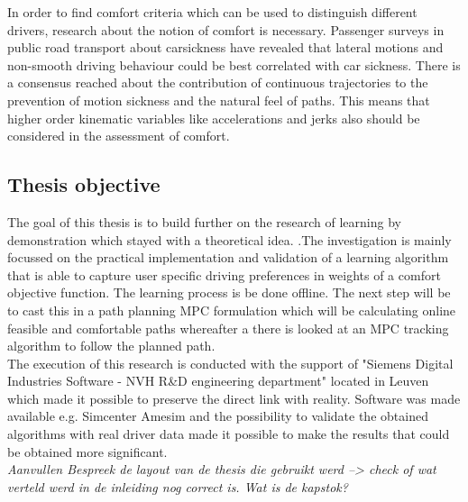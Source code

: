 In order to find comfort criteria which can be used to distinguish different drivers, research about the notion of comfort is necessary. Passenger surveys in public road transport about carsickness \cite{Turner1999} have revealed that lateral motions and non-smooth driving behaviour could be best correlated with car sickness. There is a consensus reached about the contribution of continuous trajectories to the prevention of motion sickness and the natural feel of paths.\cite{Elbanhawi2015} This means that higher order kinematic variables like accelerations and jerks also should be considered in the assessment of comfort.\\

\subsection{Thesis objective}
The goal of this thesis is to build further on the research of learning by demonstration which stayed with a theoretical idea. \cite{Kuderer2015a}.The investigation is mainly focussed on the practical implementation and validation of a learning algorithm that is able to capture user specific driving preferences in weights of a comfort objective function. The learning process is be done offline. The next step will be to cast this in a path planning MPC formulation which will be calculating online feasible and comfortable paths whereafter a there is looked at an MPC tracking algorithm to follow the planned path. \\

The execution of this research is conducted with the support of "Siemens Digital Industries Software - NVH R\&D engineering department" located in Leuven which made it possible to preserve the direct link with reality. Software was made available e.g. Simcenter Amesim and the possibility to validate the obtained algorithms with real driver data made it possible to make the results that could be obtained more significant.\\


\textit{Aanvullen
Bespreek de layout van de thesis die gebruikt werd --> check of wat verteld werd in de inleiding nog correct is. Wat is de kapstok?}


%
%



